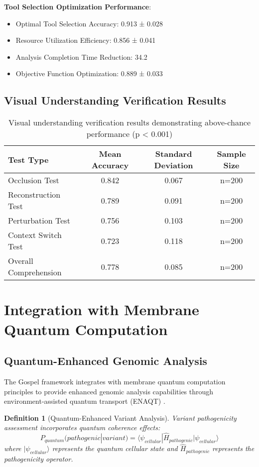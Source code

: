 \documentclass[12pt,a4paper]{article}
\newtheorem{definition}[theorem]{Definition}
\begin{document}
\textbf{Tool Selection Optimization Performance}:
\begin{itemize}
\item Optimal Tool Selection Accuracy: 0.913 ± 0.028
\item Resource Utilization Efficiency: 0.856 ± 0.041
\item Analysis Completion Time Reduction: 34.2%
\item Objective Function Optimization: 0.889 ± 0.033
\end{itemize}

\subsection{Visual Understanding Verification Results}

\begin{table}[H]
\centering
\begin{tabular}{lccc}
\toprule
Test Type & Mean Accuracy & Standard Deviation & Sample Size \\
\midrule
Occlusion Test & 0.842 & 0.067 & n=200 \\
Reconstruction Test & 0.789 & 0.091 & n=200 \\
Perturbation Test & 0.756 & 0.103 & n=200 \\
Context Switch Test & 0.723 & 0.118 & n=200 \\
Overall Comprehension & 0.778 & 0.085 & n=200 \\
\bottomrule
\end{tabular}
\caption{Visual understanding verification results demonstrating above-chance performance (p < 0.001)}
\end{table}

\section{Integration with Membrane Quantum Computation}

\subsection{Quantum-Enhanced Genomic Analysis}

The Gospel framework integrates with membrane quantum computation principles to provide enhanced genomic analysis capabilities through environment-assisted quantum transport (ENAQT) \cite{lambert2013quantum, engel2007evidence}.

\begin{definition}[Quantum-Enhanced Variant Analysis]
Variant pathogenicity assessment incorporates quantum coherence effects:
\begin{equation}
P_{quantum}(pathogenic|variant) = \langle\psi_{cellular}|\hat{H}_{pathogenic}|\psi_{cellular}\rangle
\end{equation}
where $|\psi_{cellular}\rangle$ represents the quantum cellular state and $\hat{H}_{pathogenic}$ represents the pathogenicity operator.
\end{definition}
\end{document}

